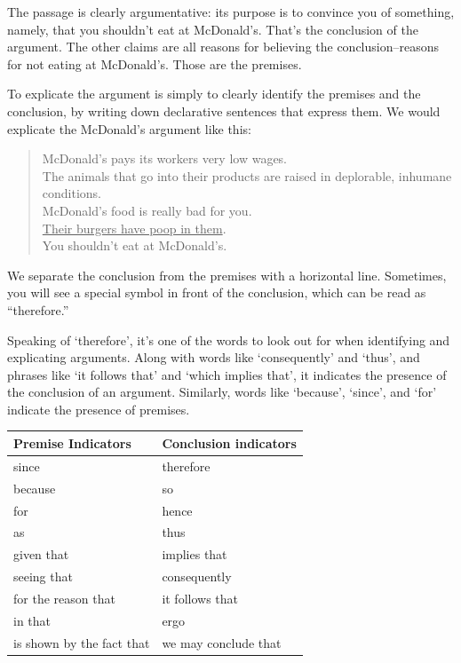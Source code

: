 The passage is clearly argumentative: its purpose is to convince you of something, namely, that
you shouldn't eat at McDonald's. That's the conclusion of the argument. The other claims are all
reasons for believing the conclusion--reasons for not eating at McDonald's. Those are the
premises.

To explicate the argument is simply to clearly identify the premises and the conclusion, by writing
down declarative sentences that express them. We would explicate the McDonald's argument like
this:

\begin{quote}
\noindent
McDonald's pays its workers very low wages. \\
The animals that go into their products are raised in deplorable, inhumane conditions. \\
McDonald's food is really bad for you. \\
\underline{Their burgers have poop in them}. \\
You shouldn't eat at McDonald's.
\end{quote}

We separate the conclusion from the premises with a horizontal line. Sometimes, you will see a special symbol
in front of the conclusion, which can be read as ``therefore.''

Speaking of `therefore', it's one of the words to look out for when identifying and explicating
arguments. Along with words like `consequently' and `thus', and phrases like `it follows that' and
`which implies that', it indicates the presence of the conclusion of an argument. Similarly, words
like `because', `since', and `for' indicate the presence of premises.\\


\begin{table}[htp]
\begin{tabular}{|l|l|}
\hline
\textbf{Premise Indicators}        & \textbf{Conclusion indicators} \\
\hline
since                     & therefore             \\
because                   & so                    \\
for                       & hence                 \\
as                        & thus                  \\
given that                & implies that          \\
seeing that               & consequently          \\
for the reason that       & it follows that       \\
in that                 & ergo                  \\
is shown by the fact that & we may conclude that \\
\hline
\end{tabular}
\end{table}

